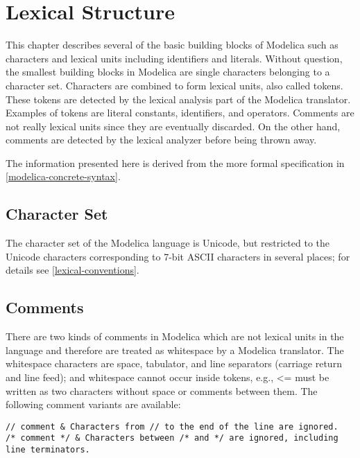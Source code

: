 \chapter{Lexical Structure}\label{lexical-structure}

This chapter describes several of the basic building blocks of Modelica
such as characters and lexical units including identifiers and literals.
Without question, the smallest building blocks in Modelica are single
characters belonging to a character set. Characters are combined to form
lexical units, also called tokens. These tokens are detected by the
lexical analysis part of the Modelica translator. Examples of tokens are
literal constants, identifiers, and operators. Comments are not really
lexical units since they are eventually discarded. On the other hand,
comments are detected by the lexical analyzer before being thrown away.

The information presented here is derived from the more formal
specification in \cref{modelica-concrete-syntax}.

\section{Character Set}\label{character-set}

The character set of the Modelica language is Unicode, but restricted to
the Unicode characters corresponding to 7-bit ASCII characters in
several places; for details see \cref{lexical-conventions}.

\section{Comments}\label{comments}

There are two kinds of comments in Modelica which are not lexical units
in the language and therefore are treated as whitespace by a Modelica
translator. The whitespace characters are space, tabulator, and line
separators (carriage return and line feed); and whitespace cannot occur
inside tokens, e.g., \textless{}= must be written as two characters
without space or comments between them.  The following comment variants are
available:
\begin{lstlisting}[language=modelica]
// comment & Characters from // to the end of the line are ignored.
/* comment */ & Characters between /* and */ are ignored, including line terminators.
\end{lstlisting}

